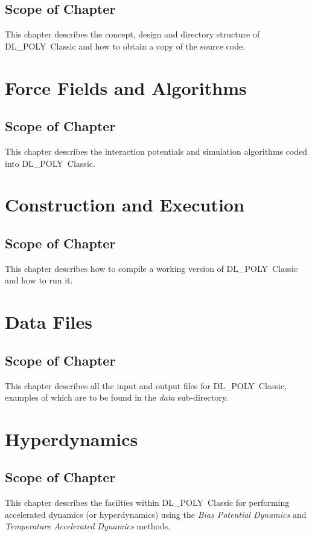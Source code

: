 \documentclass[11pt,a4paper,dvipdfm]{report}
\newcommand{\D}{\mbox{DL\_POLY Classic}}
\begin{document}
\section*{Scope of Chapter}
This chapter describes the concept, design and directory structure
of \D{} and how to obtain a copy of the source code.
\newpage


\chapter{Force Fields and Algorithms}
\label{field}
\setcounter{equation}{0}
\newpage
\section*{Scope of Chapter}
This chapter describes the interaction potentials and simulation
algorithms coded into \D{}.
\newpage



\newpage
\chapter{Construction and Execution}
\label{conex}
\setcounter{equation}{0}
\newpage
\section*{Scope of Chapter}
This chapter describes how to compile a working version of \D{}
and how to run it.
\newpage




\newpage

\chapter{Data Files}
\label{files}
\setcounter{equation}{0}
\newpage
\section*{Scope of Chapter}
This chapter describes all the input and output files for \D{},
examples of which are to be found in the {\em data} sub-directory.
\newpage

\newpage

\newpage

\chapter{Hyperdynamics}
\label{hyperdynamics}
\setcounter{equation}{0}
\newpage
\section*{Scope of Chapter}
This chapter describes the facilties within \D{} for performing
accelerated dynamics (or hyperdynamics) using the {\em Bias Potential
Dynamics} and {\em Temperature Accelerated Dynamics} methods.
\newpage

\newpage
\end{document}
